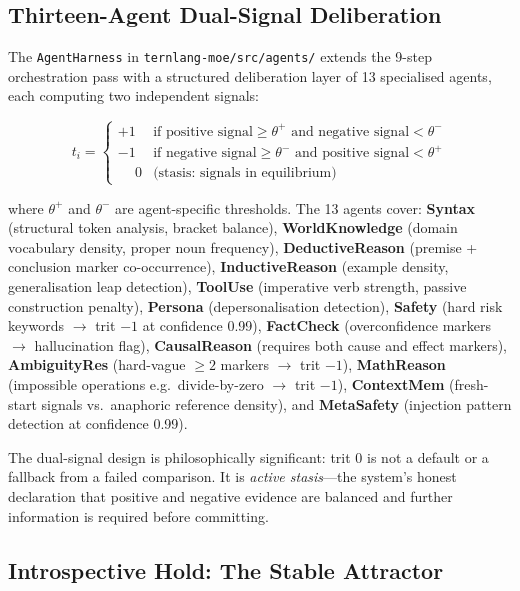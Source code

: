 \documentclass[journal,10pt,twocolumn]{IEEEtran}
\begin{document}
\subsection{Thirteen-Agent Dual-Signal Deliberation}
\label{subsec:harness}

The \texttt{AgentHarness} in \texttt{ternlang-moe/src/agents/} extends the
9-step orchestration pass with a structured deliberation layer of 13
specialised agents, each computing two independent signals:

\begin{equation}
  t_i = \begin{cases}
    +1 & \text{if positive signal} \geq \theta^+ \text{ and negative signal} < \theta^- \\
    -1 & \text{if negative signal} \geq \theta^- \text{ and positive signal} < \theta^+  \\
    \phantom{+}0 & \text{(stasis: signals in equilibrium)}
  \end{cases}
  \label{eq:dual_signal}
\end{equation}

where $\theta^+$ and $\theta^-$ are agent-specific thresholds. The 13 agents cover:
\textbf{Syntax} (structural token analysis, bracket balance),
\textbf{WorldKnowledge} (domain vocabulary density, proper noun frequency),
\textbf{DeductiveReason} (premise + conclusion marker co-occurrence),
\textbf{InductiveReason} (example density, generalisation leap detection),
\textbf{ToolUse} (imperative verb strength, passive construction penalty),
\textbf{Persona} (depersonalisation detection),
\textbf{Safety} (hard risk keywords $\to$ trit $-1$ at confidence 0.99),
\textbf{FactCheck} (overconfidence markers $\to$ hallucination flag),
\textbf{CausalReason} (requires both cause and effect markers),
\textbf{AmbiguityRes} (hard-vague $\geq 2$ markers $\to$ trit $-1$),
\textbf{MathReason} (impossible operations e.g.\ divide-by-zero $\to$ trit $-1$),
\textbf{ContextMem} (fresh-start signals vs.\ anaphoric reference density),
and \textbf{MetaSafety} (injection pattern detection at confidence 0.99).

The dual-signal design is philosophically significant: trit $0$ is not a
default or a fallback from a failed comparison. It is \emph{active stasis}—the
system's honest declaration that positive and negative evidence are balanced
and further information is required before committing.

\subsection{Introspective Hold: The Stable Attractor}
\label{subsec:hold}
\end{document}
